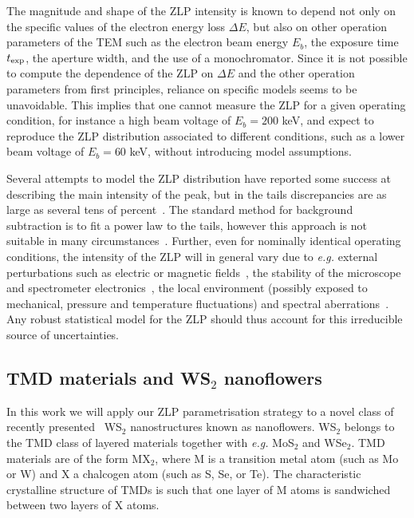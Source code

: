 The magnitude and shape of the ZLP intensity is known to depend not only on the specific values
of the electron energy loss $\Delta E$, but also on other operation parameters
of the TEM such as the electron beam energy $E_{b}$, the exposure time
$t_{\rm exp}$, the aperture width, and the use of a monochromator.
%
Since it is not possible to compute the dependence of the ZLP on $\Delta E$
and the other operation parameters from first principles,
reliance on specific models seems to be unavoidable.
%
This implies that one cannot measure the ZLP for a given operating
condition, for instance a high beam voltage of $E_{b}=200$ keV, and expect to reproduce
the ZLP distribution
associated to different conditions, such as a lower beam voltage of $E_{b}=60$ keV,
without introducing model assumptions.



Several attempts to model the ZLP distribution have reported
some success at describing the main intensity of the peak, 
but in the tails discrepancies are as large as several tens of percent~\cite{Bangert:2003}.
%
The standard method for background subtraction
is to fit a power law to the tails, however this approach is not suitable in
many circumstances~\cite{Hachtel:2018, Tenailleau:1992, Reed:2002, Bosman:2006}.
%
Further, even for nominally identical operating conditions, the intensity of the ZLP
will in general vary due to {\it e.g.} external perturbations such as electric or magnetic fields~\cite{Rafferty:2000},
the stability of the microscope and spectrometer electronics~\cite{Kothleitner:2003}, the local
environment (possibly exposed to mechanical, pressure and temperature fluctuations) 
and spectral aberrations~\cite{Egerton:1996}. 
%
Any robust statistical model for the ZLP should thus account for this irreducible source of uncertainties.



\subsection{TMD materials and WS$_2$ nanoflowers}
\label{sec:tmd}

In this work we will apply our ZLP parametrisation strategy
 to a novel class of recently presented~\cite{SabryaWS2} WS$_2$ nanostructures known
as nanoflowers.
%
WS$_2$ belongs to the TMD class of layered materials together with {\it e.g.}
MoS$_2$ and WSe$_2$.
%
TMD materials are of the form MX$_2$, where M is a 
transition metal atom (such as Mo or W) and X a chalcogen atom (such as S, Se, or Te). 
%
The characteristic crystalline structure of TMDs is such that
one layer of M atoms is sandwiched between two layers of X atoms.

